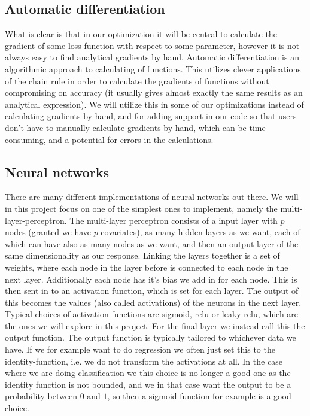 \documentclass{article}
\begin{document}
\subsection{Automatic differentiation}
What is clear is that in our optimization it will be central to calculate the
gradient of some loss function with respect to some parameter, however it is not
always easy to find analytical gradients by hand. Automatic differentiation is
an algorithmic approach to calculating of functions. This utilizes clever
applications of the chain rule in order to calculate the gradients of functions
without compromising on accuracy (it usually gives almost exactly the same
results as an analytical expression). We will utilize this in some of our
optimizations instead of calculating gradients by hand, and for adding support
in our code so that users don't have to manually calculate gradients by hand,
which can be time-consuming, and a potential for errors in the calculations.

\subsection{Neural networks}
There are many different implementations of neural networks out there. We will
in this project focus on one of the simplest ones to implement, namely the
multi-layer-perceptron. The multi-layer perceptron consists of a input layer
with $p$ nodes (granted we have $p$ covariates), as many hidden layers as we
want, each of which can have also as many nodes as we want, and then an output
layer of the same dimensionality as our response. Linking the layers together is
a set of weights, where each node in the layer before is connected to each node
in the next layer. Additionally each node has it's bias we add in for each node.
This is then sent in to an activation function, which is set for each layer. The
output of this becomes the values (also called activations) of the neurons in
the next layer. Typical choices of activation functions are sigmoid, relu or
leaky relu, which are the ones we will explore in this project. For the final
layer we instead call this the output function. The output function is typically
tailored to whichever data we have. If we for example want to do regression we
often just set this to the identity-function, i.e. we do not transform the
activations at all. In the case where we are doing classification we this choice
is no longer a good one as the identity function is not bounded, and we in that
case want the output to be a probability between $0$ and $1$, so then a
sigmoid-function for example is a good choice.
\end{document}
